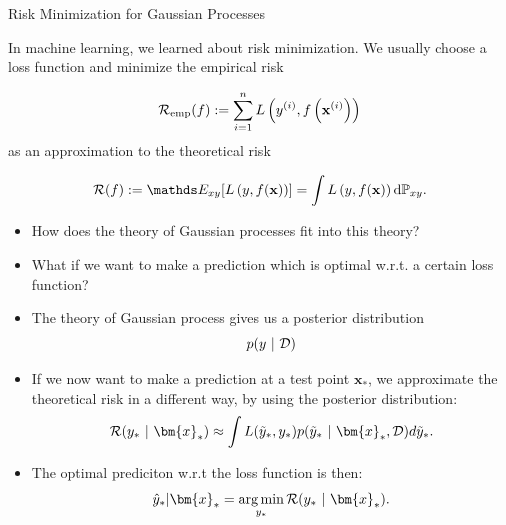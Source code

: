 \begin{vbframe}{Risk Minimization for Gaussian Processes}

In machine learning, we learned about risk minimization. We usually choose a loss function and minimize the empirical risk  

$$
  \mathcal{R}_{\text{emp}}(f) := \sum\limits_{i=1}^n L\left(y^{(i)}, f\left(\mathbf{x}^{(i)}\right)\right)
$$
as an approximation to the theoretical risk

$$ 
  \riskf := \E_{xy} [\Lxy] = \int \Lxy \text{d}\Pxy. 
$$

\begin{itemize}
  \item How does the theory of Gaussian processes fit into this theory? 
  \item What if we want to make a prediction which is optimal w.r.t. a certain loss function? 
\end{itemize}

\framebreak 

\begin{itemize}
  \item The theory of Gaussian process gives us a posterior distribution 
  $$
    p(y ~|~\mathcal{D})
  $$
  \item If we now want to make a prediction at a test point $\bm{x}_*$, we approximate the theoretical risk in a different way, by using the posterior distribution: 
  $$
    \mathcal{R}(y_* ~|~ \bm{x}_*) \approx \int L(\tilde y_*, y_*) p(\tilde y_*~|~\bm{x}_*, \D)d\tilde y_*. 
  $$
  \item The optimal prediciton w.r.t the loss function is then: 
  $$
    \hat y_* | \bm{x}_* = \argmin_{y_*} \mathcal{R}(y_*~|~ \bm{x}_*).
  $$
\end{itemize}









\end{vbframe}
